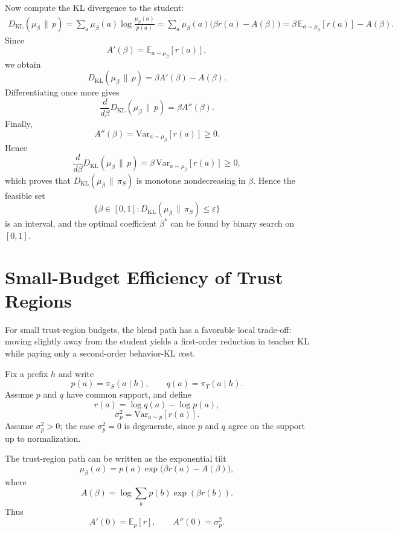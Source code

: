 \documentclass{llmxive}
\begin{document}
Now compute the KL divergence to the student:
\begin{equation*}
\begin{split}
D_{\mathrm{KL}}(\mu_\beta \,\|\, p)=
\sum_a \mu_\beta(a)\log\frac{\mu_\beta(a)}{p(a)}=
\sum_a \mu_\beta(a)\bigl(\beta r(a)-A(\beta)\bigr)=
\beta\,\mathbb{E}_{a \sim \mu_\beta}[r(a)]-A(\beta).
\end{split}
\end{equation*}
Since
\[
A'(\beta)=\mathbb{E}_{a \sim \mu_\beta}[r(a)],
\]
we obtain
\begin{equation}
D_{\mathrm{KL}}(\mu_\beta \,\|\, p)
=
\beta A'(\beta)-A(\beta).
\end{equation}
Differentiating once more gives
\begin{equation}
\frac{d}{d\beta}
D_{\mathrm{KL}}(\mu_\beta \,\|\, p)
=
\beta A''(\beta).
\end{equation}
Finally,
\begin{equation}
A''(\beta)
=
\mathrm{Var}_{a \sim \mu_\beta}[r(a)]
\ge 0.
\end{equation}
Hence
\[
\frac{d}{d\beta}
D_{\mathrm{KL}}(\mu_\beta \,\|\, p)
=
\beta\,\mathrm{Var}_{a \sim \mu_\beta}[r(a)]
\ge 0,
\]
which proves that $D_{\mathrm{KL}}(\mu_\beta \,\|\, \pi_S)$ is monotone nondecreasing in $\beta$.
Hence the feasible set
\[
\{\beta \in [0,1] : D_{\mathrm{KL}}(\mu_\beta \,\|\, \pi_S) \le \varepsilon\}
\]
is an interval, and the optimal coefficient $\beta^*$ can be found by binary search on $[0,1]$.

\section{Small-Budget Efficiency of Trust Regions}
\label{app:small_budget}

For small trust-region budgets, the blend path has a favorable local trade-off:
moving slightly away from the student yields a first-order reduction in teacher KL while paying only a second-order behavior-KL cost.

Fix a prefix $h$ and write
\[
p(a)=\pi_S(a\mid h),
\qquad
q(a)=\pi_T(a\mid h).
\]
Assume $p$ and $q$ have common support, and define
\[
r(a)=\log q(a)-\log p(a),
\]
\[
\sigma_p^2
=
\mathrm{Var}_{a\sim p}[r(a)].
\]
Assume $\sigma_p^2>0$; the case $\sigma_p^2=0$ is degenerate, since $p$ and $q$ agree on the support up to normalization.

The trust-region path can be written as the exponential tilt
\begin{equation}
\mu_\beta(a)
=
p(a)\exp\bigl(\beta r(a)-A(\beta)\bigr),
\end{equation}
where
\begin{equation}
A(\beta)
=
\log\sum_b p(b)\exp(\beta r(b)).
\end{equation}
Thus
\[
A'(0)=\mathbb{E}_p[r],
\qquad
A''(0)=\sigma_p^2.
\]
\end{document}
